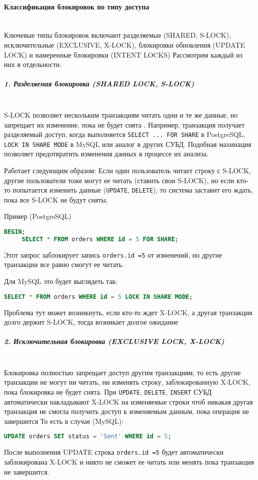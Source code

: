  \paragraph{Классификация блокировок по типу доступа} ~\\
 
 Ключевые типы блокировок включают разделяемые (SHARED, S-LOCK), исключительные (EXCLUSIVE, X-LOCK), блокировки обновления (UPDATE LOCK) и намеренные блокировки (INTENT LOCKS)
 Рассмотрим каждый из них в отдельности.
 
 \subparagraph{1. Разделяемая блокировка (SHARED LOCK, S-LOCK)} ~\\
 S-LOCK позволяет нескольким транзакциям читать одни и те же данные, но запрещает их изменение, пока не будет снята \autocite{ElmasriNavathe}.
 Например, транзакция получает разделяемый доступ, когда выполняется \texttt{SELECT ... FOR SHARE} в PostgreSQL, \texttt{LOCK IN SHARE MODE} в MySQL или аналог в других СУБД.
 Подобная махинация позволяет предотвратить изменения данных в процессе их анализа.
 
 Работает следующим образом: 
 Если один пользователь читает строку с S-LOCK, другие пользователи тоже могут ее читать (ставить свои S-LOCK), но если кто-то попытается изменить данные (\texttt{UPDATE}, \texttt{DELETE}), то система заставит его ждать, пока все S-LOCK не будут сняты.
 
 Пример (PostgreSQL)
 \begin{lstlisting}[language=SQL]
     BEGIN;
     SELECT * FROM orders WHERE id = 5 FOR SHARE;    
 \end{lstlisting}
 Этот запрос заблокирует запись \texttt{orders.id =5} от изменений, но другие транзакции все равно смогут ее читать.
 
 Для MySQL это будет выглядеть так:
 \begin{lstlisting}[language=SQL]
     SELECT * FROM orders WHERE id = 5 LOCK IN SHARE MODE;  
 \end{lstlisting}
 
 Проблема тут может возникнуть, если кто-то ждет X-LOCK, а другая транзакция долго держит S-LOCK, тогда возникает долгое ожидание
 
 \subparagraph{2. Исключительная блокировка (EXCLUSIVE LOCK, X-LOCK)} ~\\
 
 Блокировка полностью запрещает доступ другим транзакциям, то есть другие транзакции не могут ни читать, ни изменять строку, заблокированную X-LOCK, пока блокировка не будет снята.
 При \texttt{UPDATE}, \texttt{DELETE}, \texttt{INSERT} СУБД автоматически накладывают X-LOCK на изменяемые строки чтоб никакая другая транзакция не смогла получить доступ к изменяемым данным, пока операция не завершится
 То есть в случае (MySQL):
 \begin{lstlisting}[language=SQL]
     UPDATE orders SET status = 'Sent' WHERE id = 5; 
 \end{lstlisting}
 После выполнения UPDATE строка \texttt{orders.id =5} будет автоматически заблокирована X-LOCK и никто не сможет ее читать или менять пока транзакция не завершится.
 

